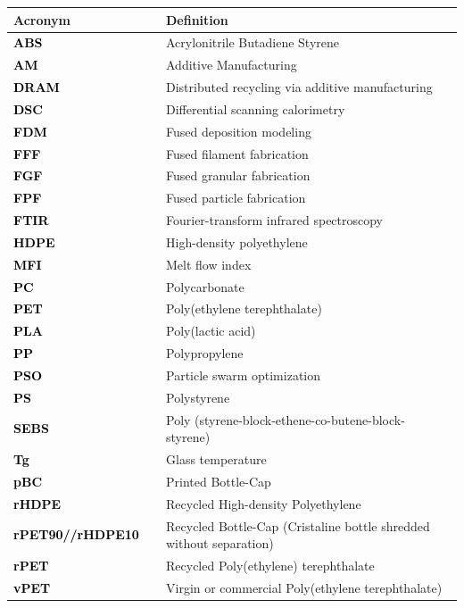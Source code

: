 \documentclass[
]{article}
\begin{document}
\begin{tabular}{>{}ll}
\toprule
Acronym & Definition\\
\midrule
\textcolor{black}{\textbf{ABS }} & Acrylonitrile Butadiene Styrene  \\
\textcolor{black}{\textbf{AM }} & Additive Manufacturing \\
\textcolor{black}{\textbf{DRAM }} & Distributed recycling via additive manufacturing \\
\textcolor{black}{\textbf{DSC }} & Differential scanning calorimetry  \\
\textcolor{black}{\textbf{FDM }} & Fused deposition modeling \\
\textcolor{black}{\textbf{FFF }} & Fused filament fabrication \\
\textcolor{black}{\textbf{FGF }} & Fused granular fabrication \\
\textcolor{black}{\textbf{FPF }} & Fused particle fabrication \\
\textcolor{black}{\textbf{FTIR }} & Fourier-transform infrared spectroscopy  \\
\textcolor{black}{\textbf{HDPE }} & High-density polyethylene \\
\textcolor{black}{\textbf{MFI }} & Melt flow index \\
\textcolor{black}{\textbf{PC }} & Polycarbonate \\
\textcolor{black}{\textbf{PET }} & Poly(ethylene terephthalate) \\
\textcolor{black}{\textbf{PLA }} & Poly(lactic acid) \\
\textcolor{black}{\textbf{PP }} & Polypropylene  \\
\textcolor{black}{\textbf{PSO }} & Particle swarm optimization \\
\textcolor{black}{\textbf{PS }} & Polystyrene \\
\textcolor{black}{\textbf{SEBS }} & Poly (styrene-block-ethene-co-butene-block-styrene) \\
\textcolor{black}{\textbf{Tg }} & Glass temperature \\
\textcolor{black}{\textbf{pBC }} & Printed Bottle-Cap \\
\textcolor{black}{\textbf{rHDPE }} & Recycled High-density Polyethylene \\
\textcolor{black}{\textbf{rPET90//rHDPE10  }} & Recycled Bottle-Cap (Cristaline bottle shredded without separation) \\
\textcolor{black}{\textbf{rPET }} & Recycled Poly(ethylene) terephthalate \\
\textcolor{black}{\textbf{vPET }} & Virgin or commercial Poly(ethylene terephthalate) \\
\bottomrule
\end{tabular}
\endgroup{}
\end{document}
